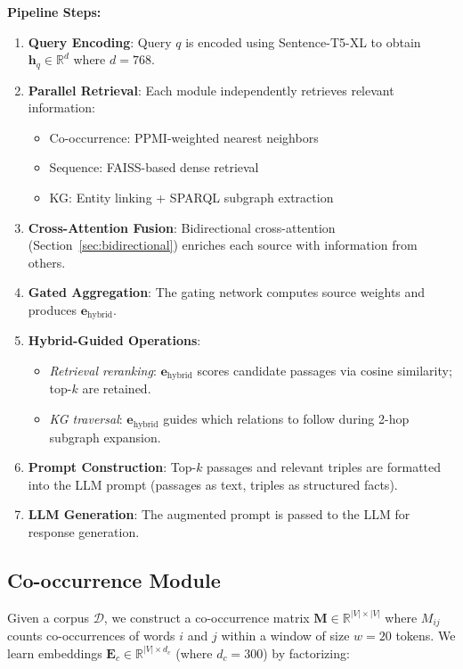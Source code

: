 \documentclass[10pt,twocolumn]{article}
\begin{document}
\textbf{Pipeline Steps:}
\begin{enumerate}
    \item \textbf{Query Encoding}: Query $q$ is encoded using Sentence-T5-XL to obtain $\mathbf{h}_q \in \mathbb{R}^{d}$ where $d=768$.
    \item \textbf{Parallel Retrieval}: Each module independently retrieves relevant information:
    \begin{itemize}
        \item Co-occurrence: PPMI-weighted nearest neighbors
        \item Sequence: FAISS-based dense retrieval
        \item KG: Entity linking + SPARQL subgraph extraction
    \end{itemize}
    \item \textbf{Cross-Attention Fusion}: Bidirectional cross-attention (Section~\ref{sec:bidirectional}) enriches each source with information from others.
    \item \textbf{Gated Aggregation}: The gating network computes source weights and produces $\mathbf{e}_{\text{hybrid}}$.
    \item \textbf{Hybrid-Guided Operations}:
    \begin{itemize}
        \item \textit{Retrieval reranking}: $\mathbf{e}_{\text{hybrid}}$ scores candidate passages via cosine similarity; top-$k$ are retained.
        \item \textit{KG traversal}: $\mathbf{e}_{\text{hybrid}}$ guides which relations to follow during 2-hop subgraph expansion.
    \end{itemize}
    \item \textbf{Prompt Construction}: Top-$k$ passages and relevant triples are formatted into the LLM prompt (passages as text, triples as structured facts).
    \item \textbf{LLM Generation}: The augmented prompt is passed to the LLM for response generation.
\end{enumerate}


\subsection{Co-occurrence Module}

Given a corpus $\mathcal{D}$, we construct a co-occurrence matrix $\mathbf{M} \in \mathbb{R}^{|V| \times |V|}$ where $M_{ij}$ counts co-occurrences of words $i$ and $j$ within a window of size $w=20$ tokens. We learn embeddings $\mathbf{E}_c \in \mathbb{R}^{|V| \times d_c}$ (where $d_c=300$) by factorizing:
\end{document}
